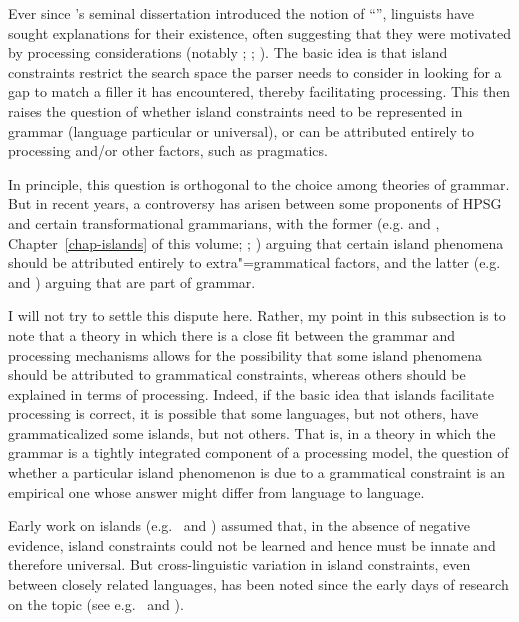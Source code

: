 \documentclass[output=paper
                ,modfonts
                ,nonflat
	        ,collection
	        ,collectionchapter
	        ,collectiontoclongg
 	        ,biblatex
                ,babelshorthands
                ,newtxmath
                ,draftmode
                ,colorlinks, citecolor=brown
]{./langsci/langscibook}
\begin{document}
Ever since \citeauthor{Ross67}'s seminal dissertation \citeyearpar{Ross67} introduced the notion of ``'', linguists have sought explanations for their existence, often suggesting that they were motivated by processing considerations (notably \citealt{Grosu72-u}; \citealt{Fodor83}; \citealt{Deane91}).  The basic idea is that island constraints restrict the search space the parser needs to consider in looking for a gap to match a filler it has encountered, thereby facilitating processing.  This then raises the question of whether island constraints need to be represented in grammar (language particular or universal), or can be attributed entirely to processing and/or other factors, such as pragmatics.

In principle, this question is orthogonal to the choice among theories of grammar.  But in recent
years, a controversy has arisen between some proponents of HPSG and certain transformational
grammarians, with the former (e.g. \citeauthor{Chaves2012} \citeyear{Chaves2012} and
\citeyear{chapters/islands}, Chapter~\ref{chap-islands} of this volume; \citealt{HofmeisterSag2010}; \citealt*{HofmeisterEtal2013}) arguing that certain island phenomena should be attributed entirely to extra"=grammatical factors, and the latter (e.g.\ \citealt{Phillips2013} and \citealt{SWP2012a-u}) arguing that  are part of grammar.

I will not try to settle this dispute here.  Rather, my point in this subsection is to note that a theory in which there is a close fit between the grammar and processing mechanisms allows for the possibility that some island phenomena should be attributed to grammatical constraints, whereas others should be explained in terms of processing.  Indeed, if the basic idea that islands facilitate processing is correct, it is possible that some languages, but not others, have grammaticalized some islands, but not others.  That is, in a theory in which the grammar is a tightly integrated component of a processing model, the question of whether a particular island phenomenon is due to a grammatical constraint is an empirical one whose answer might differ from language to language. 

Early work on islands (e.g.\ \citealt{Ross67} and \citealt{Chomsky73a}) assumed that, in the absence of negative evidence, island constraints could not be learned and hence must be innate and therefore universal.  But cross-linguistic variation in island constraints, even between closely related languages, has been noted since the early days of research on the topic (see e.g.\ \citealt{Erteschik73a-u} and \citealt{EngdahlEjerhed82}).
\end{document}
